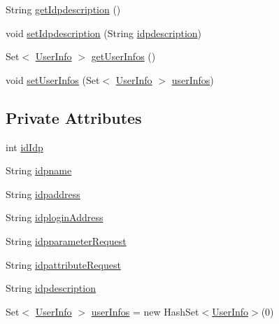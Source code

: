 \begin{DoxyCompactItemize}
\item 
String \hyperlink{classportal_1_1registration_1_1domain_1_1Idp_ad67ae86c69db43d8ba70102a44e6f15f}{getIdpdescription} ()
\item 
void \hyperlink{classportal_1_1registration_1_1domain_1_1Idp_ab9d080023e1899f2bc6a82011047ad43}{setIdpdescription} (String \hyperlink{classportal_1_1registration_1_1domain_1_1Idp_a55fbc92095f6fd9d1fb4c5bd42b18baa}{idpdescription})
\item 
Set$<$ \hyperlink{classportal_1_1registration_1_1domain_1_1UserInfo}{UserInfo} $>$ \hyperlink{classportal_1_1registration_1_1domain_1_1Idp_a9b7aa194175493052d8a460e61163bae}{getUserInfos} ()
\item 
void \hyperlink{classportal_1_1registration_1_1domain_1_1Idp_abcc606566a414198ea129e7b5614b413}{setUserInfos} (Set$<$ \hyperlink{classportal_1_1registration_1_1domain_1_1UserInfo}{UserInfo} $>$ \hyperlink{classportal_1_1registration_1_1domain_1_1Idp_a888963b67e250b7810486a9566d90e62}{userInfos})
\end{DoxyCompactItemize}
\subsection*{Private Attributes}
\begin{DoxyCompactItemize}
\item 
int \hyperlink{classportal_1_1registration_1_1domain_1_1Idp_a73cc8adc0bc9d24116a0f5ca6ab8a2bf}{idIdp}
\item 
String \hyperlink{classportal_1_1registration_1_1domain_1_1Idp_a26fab2dd3a812749a8cef7b376d529f7}{idpname}
\item 
String \hyperlink{classportal_1_1registration_1_1domain_1_1Idp_a3eaa57b7e2ce7351be26c8eab9dba8e9}{idpaddress}
\item 
String \hyperlink{classportal_1_1registration_1_1domain_1_1Idp_a4690c173d3e4110cd5501e5c7818ae23}{idploginAddress}
\item 
String \hyperlink{classportal_1_1registration_1_1domain_1_1Idp_acd9b443db5b19445703d63d4f340cf9a}{idpparameterRequest}
\item 
String \hyperlink{classportal_1_1registration_1_1domain_1_1Idp_abf267afc4e5c91da690804e5abbef7df}{idpattributeRequest}
\item 
String \hyperlink{classportal_1_1registration_1_1domain_1_1Idp_a55fbc92095f6fd9d1fb4c5bd42b18baa}{idpdescription}
\item 
Set$<$ \hyperlink{classportal_1_1registration_1_1domain_1_1UserInfo}{UserInfo} $>$ \hyperlink{classportal_1_1registration_1_1domain_1_1Idp_a888963b67e250b7810486a9566d90e62}{userInfos} = new HashSet$<$\hyperlink{classportal_1_1registration_1_1domain_1_1UserInfo}{UserInfo}$>$(0)
\end{DoxyCompactItemize}
